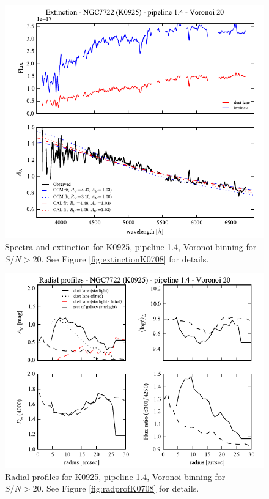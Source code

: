 \documentclass[a4paper]{article}
\begin{document}
\begin{figure}[H]
\includegraphics{figures/spectra_K0925_1.4_v20.pdf}
\caption{Spectra and extinction for K0925, pipeline 1.4, Voronoi binning for
$S/N > 20$. See Figure \ref{fig:extinctionK0708} for details.}
\end{figure}

\begin{figure}[H]
\includegraphics{figures/radprof_K0925_1.4_v20.pdf}
\caption{Radial profiles for K0925, pipeline 1.4, Voronoi binning for $S/N >
20$. See Figure \ref{fig:radprofK0708} for details.}
\label{fig:radprof_K0925_14_v20}
\end{figure}
\end{document}
